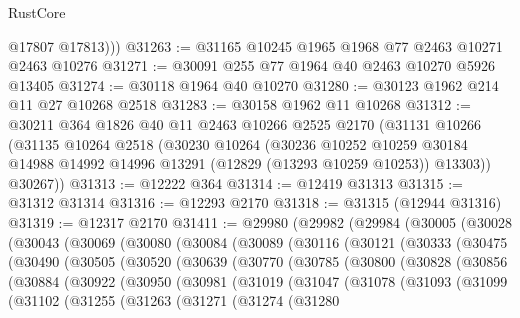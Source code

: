 \begin{lexlean}{RustCore}
\begin{coremodule}
          @17807
          @17813)))
@31263 := @31165 @10245 @1965 @1968 @77 @2463 @10271 @2463 @10276
@31271 := @30091 @255 @77 @1964 @40 @2463 @10270 @5926 @13405
@31274 := @30118 @1964 @40 @10270
@31280 := @30123 @1962 @214 @11 @27 @10268 @2518
@31283 := @30158 @1962 @11 @10268
@31312 := @30211
    @364
    @1826
    @40
    @11
    @2463
    @10266
    @2525
    @2170
    (@31131
      @10266
      (@31135
        @10264
        @2518
        (@30230
          @10264
          (@30236
            @10252
            @10259
            @30184
            @14988
            @14992
            @14996
            @13291
            (@12829 (@13293 @10259 @10253))
            @13303))
        @30267))
@31313 := @12222 @364
@31314 := @12419 @31313
@31315 := @31312 @31314
@31316 := @12293 @2170
@31318 := @31315 (@12944 @31316)
@31319 := @12317 @2170
@31411 := @29980
    (@29982
      (@29984
        (@30005
          (@30028
            (@30043
              (@30069
                (@30080
                  (@30084
                    (@30089
                      (@30116
                        (@30121
                          (@30333
                            (@30475
                              (@30490
                                (@30505
                                  (@30520
                                    (@30639
                                      (@30770
                                        (@30785
                                          (@30800
                                            (@30828
                                              (@30856
                                                (@30884
                                                  (@30922
                                                    (@30950
                                                      (@30981
                                                        (@31019
                                                          (@31047
                                                            (@31078
                                                              (@31093
                                                                (@31099
                                                                  (@31102
                                                                    (@31255
                                                                      (@31263
                                                                        (@31271
                                                                          (@31274
                                                                            (@31280

\end{coremodule}
\end{lexlean}
